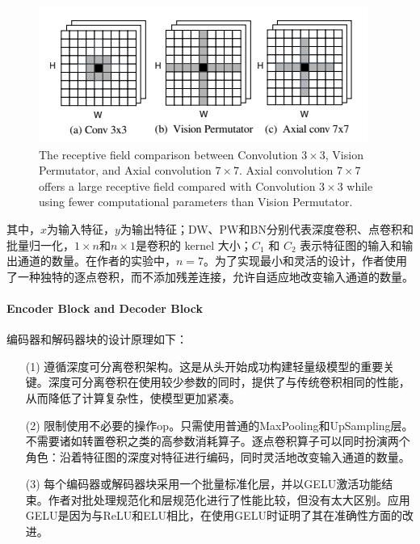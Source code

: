 \documentclass[a4paper, 10pt]{article}
\begin{document}
			\begin{figure}[htbp]
				\centering 
				\includegraphics[width=0.6\columnwidth]{picture/Lightweight Model/Receptive Field}
				\caption{
					\label{fig: Receptive Field} 
					The receptive field comparison between Convolution $3 \times 3$,
					Vision Permutator, and Axial convolution $7 \times 7$. Axial convolution
					$7 \times 7$ offers a large receptive field compared with Convolution
					$3 \times 3$ while using fewer computational parameters than Vision
					Permutator.
				}
			\end{figure}
			
			其中，$x$为输入特征，$y$为输出特征；DW、PW和BN分别代表深度卷积、点卷积和批量归一化，$1 \times n$和$n \times 1$是卷积的 kernel 大小；$C_1$ 和 $C_2$ 表示特征图的输入和输出通道的数量。在作者的实验中，$n=7$。为了实现最小和灵活的设计，作者使用了一种独特的逐点卷积，而不添加残差连接，允许自适应地改变输入通道的数量。
			
			\paragraph{Encoder Block and Decoder Block}
			
			编码器和解码器块的设计原理如下：
			
			\begin{itemize}
				\item [(1)] 遵循深度可分离卷积架构。这是从头开始成功构建轻量级模型的重要关键。深度可分离卷积在使用较少参数的同时，提供了与传统卷积相同的性能，从而降低了计算复杂性，使模型更加紧凑。
				\item [(2)] 限制使用不必要的操作op。只需使用普通的MaxPooling和UpSampling层。不需要诸如转置卷积之类的高参数消耗算子。逐点卷积算子可以同时扮演两个角色：沿着特征图的深度对特征进行编码，同时灵活地改变输入通道的数量。
				\item [(3)] 每个编码器或解码器块采用一个批量标准化层，并以GELU激活功能结束。作者对批处理规范化和层规范化进行了性能比较，但没有太大区别。应用GELU是因为与ReLU和ELU相比，在使用GELU时证明了其在准确性方面的改进。
			\end{itemize}
			
\end{document}

